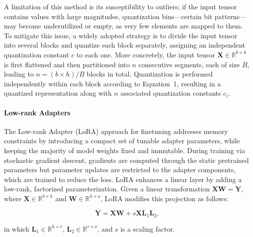 A limitation of this method is its susceptibility to outliers; if the input tensor contains values with large magnitudes, quantization bins—certain bit patterns—may become underutilized or empty, as very few elements are mapped to them. To mitigate this issue, a widely adopted strategy is to divide the input tensor into several blocks and quantize each block separately, assigning an independent quantization constant $c$ to each one. More concretely, the input tensor $\mathbf{X}\in \mathbb{R}^{b\times h}$ is first flattened and then partitioned into $n$ consecutive segments, each of size $B$, leading to ${n = ({b\times h} )/{B} }$ blocks in total. Quantization is performed independently within each block according to Equation~1, resulting in a quantized representation along with $n$ associated quantization constants $c_i$.

\paragraph{Low-rank Adapters} The Low-rank Adapter (LoRA) approach for finetuning \citep{hu2021lora} addresses memory constraints by introducing a compact set of tunable adapter parameters, while keeping the majority of model weights fixed and immutable. During training via stochastic gradient descent, gradients are computed through the static pretrained parameters but parameter updates are restricted to the adapter components, which are trained to reduce the loss. LoRA enhances a linear layer by adding a low-rank, factorized parameterization. Given a linear transformation ${\mathbf{X} \mathbf{W} = \mathbf{Y}}$, where $\mathbf{X}\in  \mathbb{R}^{b\times h}$ and $\mathbf{W}\in  \mathbb{R}^{h\times o}$, LoRA modifies this projection as follows:

\begin{equation}
    \mathbf{Y} = \mathbf{X}\mathbf{W} + s\mathbf{X}\mathbf{L}_1\mathbf{L}_2,
\end{equation}

in which $\mathbf{L}_1\in  \mathbb{R}^{h\times r}$, $\mathbf{L}_2\in  \mathbb{R}^{r\times o}$, and $s$ is a scaling factor.

